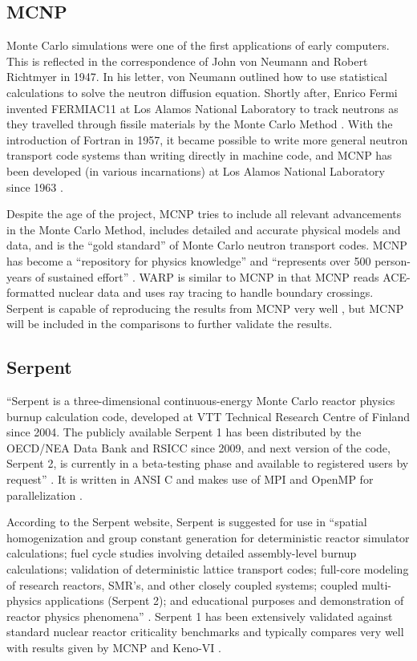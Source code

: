 \subsection{MCNP}

Monte Carlo simulations were one of the first applications of early computers.   This is reflected in the correspondence of John von Neumann and  Robert Richtmyer  in 1947.  In his letter, von Neumann outlined how to use statistical calculations to solve the neutron diffusion equation.  Shortly after, Enrico Fermi invented FERMIAC11 at Los Alamos National Laboratory to track neutrons as they travelled through fissile materials by the Monte Carlo Method \cite{mcnp}.  With the introduction of Fortran in 1957, it became possible to write more general neutron transport code systems than writing directly in machine code, and MCNP has been developed (in various incarnations) at Los Alamos National Laboratory since 1963 \cite{mcnp}.
 
Despite the age of the project, MCNP tries to include all relevant advancements in the Monte Carlo Method, includes detailed and accurate physical models and data, and is the ``gold standard'' of Monte Carlo neutron transport codes.  MCNP has become a ``repository for physics knowledge'' and ``represents over 500 person-years of sustained effort'' \cite{mcnp}.   WARP is similar to MCNP in that MCNP reads ACE-formatted nuclear data and uses ray tracing to handle boundary crossings.  Serpent is capable of reproducing the results from MCNP very well \cite{}, but MCNP will be included in the comparisons to further validate the results.

\subsection{Serpent}

``Serpent is a three-dimensional continuous-energy Monte Carlo reactor physics burnup calculation code, developed at VTT Technical Research Centre of Finland since 2004. The publicly available Serpent 1 has been distributed by the OECD/NEA Data Bank and RSICC since 2009, and next version of the code, Serpent 2, is currently in a beta-testing phase and available to registered users by request'' \cite{serpent}.  It is written in ANSI C and makes use of MPI and OpenMP for parallelization \cite{jaakko}.

 According to the Serpent website, Serpent is suggested for use in ``spatial homogenization and group constant generation for deterministic reactor simulator calculations; fuel cycle studies involving detailed assembly-level burnup calculations; validation of deterministic lattice transport codes; full-core modeling of research reactors, SMR's, and other closely coupled systems; coupled multi-physics applications (Serpent 2);  and educational purposes and demonstration of reactor physics phenomena'' \cite{serpent}.  Serpent 1 has been extensively validated against standard nuclear reactor criticality benchmarks and typically compares very well with results given by MCNP and Keno-VI \cite{serpent}.

